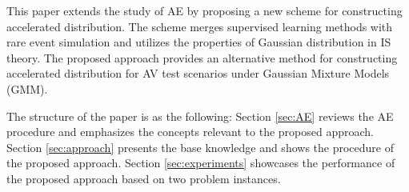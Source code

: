 \documentclass[letterpaper, 10 pt, journal]{IEEEtran}  %
\newcommand{\mansur}[1]{\textcolor{blue}{[Mansur: #1]}}
\begin{document}


This paper extends the study of AE by proposing a new scheme for constructing accelerated distribution. The scheme merges supervised learning methods with rare event simulation and utilizes the properties of Gaussian distribution in IS theory. The proposed approach provides an alternative method for constructing accelerated distribution for AV test scenarios under Gaussian Mixture Models (GMM).



The structure of the paper is as the following: Section \ref{sec:AE} reviews the AE procedure and emphasizes the concepts relevant to the proposed approach. Section \ref{sec:approach} presents the base knowledge and shows the procedure of the proposed approach. Section \ref{sec:experiments} showcases the performance of the proposed approach based on two problem instances.
\end{document}
